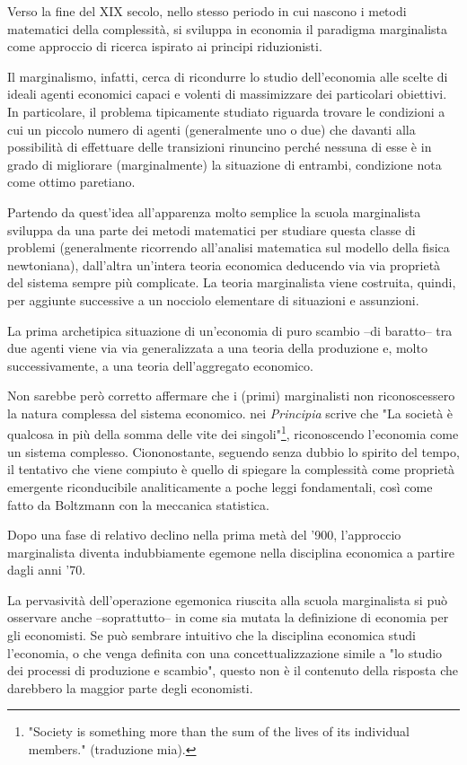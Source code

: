 \documentclass[a4paper, headings=standardclasses]{scrartcl}
\begin{document}
Verso la fine del XIX secolo, nello stesso periodo in cui nascono i metodi matematici
della complessità, si sviluppa in economia il paradigma marginalista come approccio di ricerca ispirato ai principi riduzionisti. 

Il marginalismo, infatti, cerca di ricondurre lo studio dell'economia alle scelte di ideali agenti economici capaci e volenti di massimizzare dei particolari obiettivi. 
In particolare, il problema tipicamente studiato riguarda trovare le condizioni a cui un piccolo numero di agenti (generalmente uno o due) che davanti alla possibilità di effettuare delle transizioni rinuncino perché nessuna di esse è in grado di migliorare (marginalmente) la situazione di entrambi, condizione nota come ottimo paretiano.

Partendo da quest'idea all'apparenza molto semplice la scuola marginalista sviluppa da una parte dei metodi matematici per studiare questa classe di problemi (generalmente ricorrendo all'analisi matematica sul modello della fisica newtoniana), dall'altra un'intera teoria economica deducendo via via proprietà del sistema sempre più complicate.
La teoria marginalista viene costruita, quindi, per aggiunte successive a un nocciolo elementare di situazioni e assunzioni.

La prima archetipica situazione di un'economia di puro scambio --di baratto-- tra due agenti viene via via generalizzata a una teoria della produzione e, molto successivamente, a una teoria dell'aggregato economico.

Non sarebbe però corretto affermare che i (primi) marginalisti non riconoscessero la natura complessa del sistema economico.
\textcite[p. 20]{marshall1988} nei \textit{Principia} scrive che "La società è qualcosa in più della somma delle vite dei singoli"\footnote{"Society is something more than the sum of the lives of its individual members." (traduzione mia).}, riconoscendo l'economia come un sistema complesso.
Ciononostante, seguendo senza dubbio lo spirito del tempo, il tentativo che viene compiuto è quello di spiegare la complessità come proprietà emergente riconducibile analiticamente a poche leggi fondamentali, così come fatto da Boltzmann con la meccanica statistica.

Dopo una fase di relativo declino nella prima metà del '900, l'approccio marginalista diventa indubbiamente egemone nella disciplina economica a partire dagli anni '70. 

La pervasività dell'operazione egemonica riuscita alla scuola marginalista si può osservare anche --soprattutto-- in come sia mutata la definizione di economia per gli economisti. 
Se può sembrare intuitivo che la disciplina economica studi l'economia, o che venga definita con una concettualizzazione simile a "lo studio dei processi di produzione e scambio", questo non è il contenuto della risposta che darebbero la maggior parte degli economisti.
\end{document}
